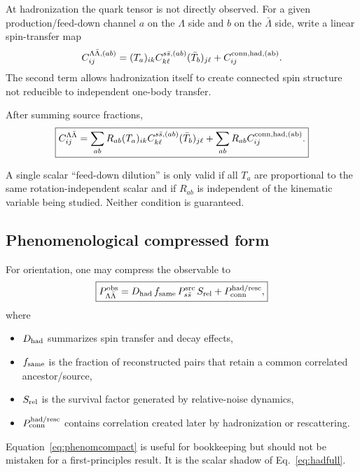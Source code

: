 \documentclass[11pt]{article}
\begin{document}
At hadronization the quark tensor is not directly observed. For a given production/feed-down channel $a$ on the $\Lambda$ side and $b$ on the $\bar\Lambda$ side, write a linear spin-transfer map
\begin{equation}
C^{\Lambda\bar\Lambda,(ab)}_{ij}
=(T_a)_{ik}
C^{s\bar s,(ab)}_{k\ell}
(\bar T_b)_{j\ell}
+C^{\rm conn,had,(ab)}_{ij}.
\label{eq:hadmap}
\end{equation}
The second term allows hadronization itself to create connected spin structure not reducible to independent one-body transfer.

After summing source fractions,
\begin{equation}
\boxed{
C^{\Lambda\bar\Lambda}_{ij}
=\sum_{ab}R_{ab}
(T_a)_{ik}
C^{s\bar s,(ab)}_{k\ell}
(\bar T_b)_{j\ell}
+\sum_{ab}R_{ab}C^{\rm conn,had,(ab)}_{ij}.
}
\label{eq:hadfull}
\end{equation}

A single scalar ``feed-down dilution'' is only valid if all $T_a$ are proportional to the same rotation-independent scalar and if $R_{ab}$ is independent of the kinematic variable being studied. Neither condition is guaranteed.

\subsection{Phenomenological compressed form}

For orientation, one may compress the observable to
\begin{equation}
\boxed{
P_{\Lambda\bar\Lambda}^{\rm obs}
=D_{\rm had}\,
f_{\rm same}\,
P_{s\bar s}^{\rm src}\,
S_{\rm rel}
+P_{\rm conn}^{\rm had/resc},
}
\label{eq:phenomcompact}
\end{equation}
where

\begin{itemize}[leftmargin=1.5em]
\item $D_{\rm had}$ summarizes spin transfer and decay effects,
\item $f_{\rm same}$ is the fraction of reconstructed pairs that retain a common correlated ancestor/source,
\item $S_{\rm rel}$ is the survival factor generated by relative-noise dynamics,
\item $P_{\rm conn}^{\rm had/resc}$ contains correlation created later by hadronization or rescattering.
\end{itemize}

Equation~\eqref{eq:phenomcompact} is useful for bookkeeping but should not be mistaken for a first-principles result. It is the scalar shadow of Eq.~\eqref{eq:hadfull}.
\end{document}
